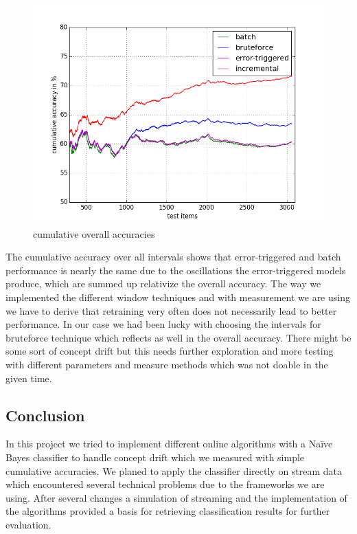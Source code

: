 \documentclass{article} %
\begin{document}
 \begin{figure}[htbp]
  \centering
  \includegraphics[scale=0.5]{./plots/allAcc.png}
  \caption{cumulative overall accuracies}
\end{figure}
The cumulative accuracy over all intervals shows that error-triggered and batch performance is nearly the same due to the oscillations the error-triggered models produce, which are summed up relativize the overall accuracy. The way we implemented the different window techniques and with measurement we are using we have to derive that retraining very often does not necessarily lead to better performance. In our case we had been lucky with choosing the intervals for bruteforce technique which reflects as well in the overall accuracy. There might be some sort of concept drift but this needs further exploration and more testing with different parameters and measure methods which was not doable in the given time.

\subsection{Conclusion}
In this project we tried to implement different online algorithms with a Na\"ive Bayes classifier to handle concept drift which we measured with simple cumulative accuracies. We planed to apply the classifier directly on stream data which encountered several technical problems due to the frameworks we are using. After several changes a simulation of streaming and the implementation of the algorithms provided a basis for retrieving classification results for further evaluation.   
\end{document}
